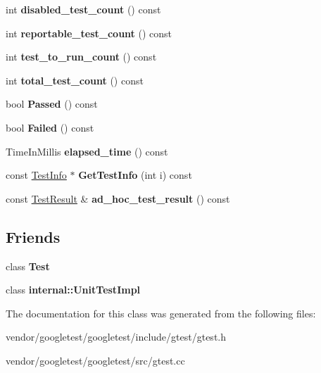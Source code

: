 \begin{DoxyCompactItemize}
int {\bfseries disabled\+\_\+test\+\_\+count} () const
\item 
\mbox{\label{classtesting_1_1_test_case_ae4e69f1a77b6aba274981e987e50acab}} 
int {\bfseries reportable\+\_\+test\+\_\+count} () const
\item 
\mbox{\label{classtesting_1_1_test_case_a57f115315eb756e23be6651bb5e6c638}} 
int {\bfseries test\+\_\+to\+\_\+run\+\_\+count} () const
\item 
\mbox{\label{classtesting_1_1_test_case_aba3cab19aaf7295284f0832f2cf895a3}} 
int {\bfseries total\+\_\+test\+\_\+count} () const
\item 
\mbox{\label{classtesting_1_1_test_case_a29bbfd227b732a90198b5280c039c271}} 
bool {\bfseries Passed} () const
\item 
\mbox{\label{classtesting_1_1_test_case_ae71c30eab6f1673b82090a0e745c2aa5}} 
bool {\bfseries Failed} () const
\item 
\mbox{\label{classtesting_1_1_test_case_acd7d6a77bce06da6ef90f5dad1c4def1}} 
Time\+In\+Millis {\bfseries elapsed\+\_\+time} () const
\item 
\mbox{\label{classtesting_1_1_test_case_a441e0eca232643671dc365c2924c255c}} 
const \hyperlink{classtesting_1_1_test_info}{Test\+Info} $\ast$ {\bfseries Get\+Test\+Info} (int i) const
\item 
\mbox{\label{classtesting_1_1_test_case_a6d5fc5003bc3352f3ddae7dadc6d2364}} 
const \hyperlink{classtesting_1_1_test_result}{Test\+Result} \& {\bfseries ad\+\_\+hoc\+\_\+test\+\_\+result} () const
\end{DoxyCompactItemize}
\subsection*{Friends}
\begin{DoxyCompactItemize}
\item 
\mbox{\label{classtesting_1_1_test_case_a5b78b1c2e1fa07ffed92da365593eaa4}} 
class {\bfseries Test}
\item 
\mbox{\label{classtesting_1_1_test_case_acc0a5e7573fd6ae7ad1878613bb86853}} 
class {\bfseries internal\+::\+Unit\+Test\+Impl}
\end{DoxyCompactItemize}


The documentation for this class was generated from the following files\+:\begin{DoxyCompactItemize}
\item 
vendor/googletest/googletest/include/gtest/gtest.\+h\item 
vendor/googletest/googletest/src/gtest.\+cc\end{DoxyCompactItemize}
